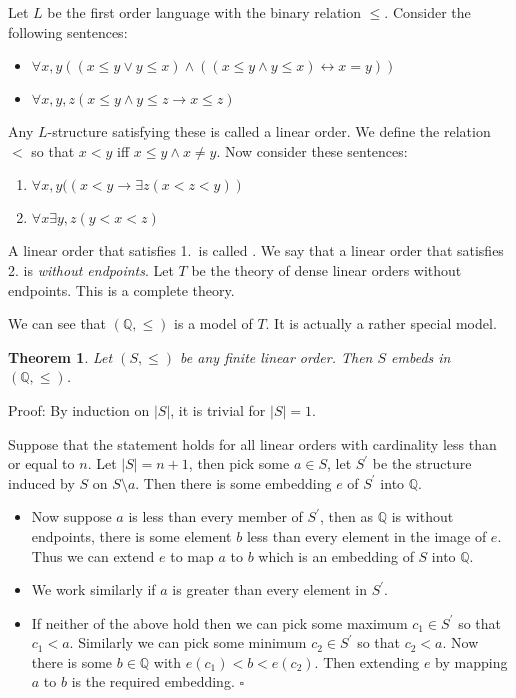 \documentclass[12pt]{article}
\newtheorem{theorem}{Theorem}
\def\Q{\mathbb{Q}}
\begin{document}

Let $L$ be the first order language with the binary relation $\leq$. Consider the following sentences:
\begin{itemize}
\item $\forall x,y ((x\leq y \lor y\leq x) \land ((x \leq y \land y\leq x )\leftrightarrow x=y))$
\item $\forall x,y,z (x \leq y \land y \leq z \rightarrow x \leq z)$ \end{itemize}
Any $L$-structure satisfying these is called a linear order. 
We define the relation $<$ so that $x<y$ iff $x \leq y \land x \neq y$. Now consider these sentences:
\begin{enumerate}
\item $\forall x,y ((x < y  \rightarrow \exists z(x<z<y))$
\item $\forall x \exists y,z(y<x <z)$ \end{enumerate}
A linear order that satisfies 1.\ is called . 
We say that a linear order that satisfies 2. is {\em without endpoints}. 
Let $T$ be the theory of dense linear orders without endpoints. This is a complete theory.

We can see that $(\Q,\leq)$ is a model of $T$. It is actually a rather special model.

\begin{theorem} 
\label{one} Let $(S,\leq)$ be any finite linear order. Then $S$ embeds in $(\Q,\leq)$.
\end{theorem}
Proof: By induction on $|S|$, it is trivial for $|S|=1$. 

Suppose that the statement holds for all linear orders with cardinality less than or equal to $n$.
Let $|S|=n+1$, then pick some $a \in S$, let $S^{\prime}$ be the structure induced by $S$ on $S\setminus {a}$. 
Then there is some embedding $e$ of $S^{\prime}$ into $\Q$. 

\begin{itemize}
\item Now suppose $a$ is less than every member of $S^{\prime}$, then as $\Q$ is without endpoints, there is some element $b$ less than every element in the image of $e$. 
Thus we can extend $e$ to map $a$ to $b$ which is an embedding of $S$ into $\Q$. 
\item We work similarly if $a$ is greater than every element in $S^{\prime}$.
\item If neither of the above hold then we can pick some maximum $c_{1} \in S^{\prime}$ so that $c_{1}<a$. 
Similarly we can pick some minimum $c_{2} \in S^{\prime}$ so that $c_{2}<a$. Now there is some $b \in \Q$ with $e(c_{1})<b<e(c_{2})$. Then extending $e$ by mapping $a$ to $b$ is the required embedding. $\square$ \end{itemize}
\end{document}
